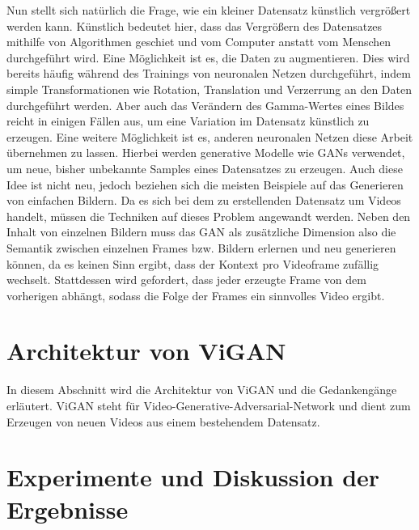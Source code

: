 Nun stellt sich natürlich die Frage, wie ein kleiner Datensatz künstlich
vergrößert werden kann. Künstlich bedeutet hier, dass das Vergrößern des
Datensatzes mithilfe von Algorithmen geschiet und vom Computer anstatt vom
Menschen durchgeführt wird. Eine Möglichkeit ist es, die Daten zu augmentieren.
Dies wird bereits häufig während des Trainings von neuronalen Netzen
durchgeführt, indem simple Transformationen wie Rotation, Translation und
Verzerrung an den Daten durchgeführt werden. Aber auch das Verändern des
Gamma-Wertes eines Bildes reicht in einigen Fällen aus, um eine Variation im
Datensatz künstlich zu erzeugen. Eine weitere Möglichkeit ist es, anderen
neuronalen Netzen diese Arbeit übernehmen zu lassen. Hierbei werden generative
Modelle wie GANs verwendet, um neue, bisher unbekannte Samples eines Datensatzes
zu erzeugen. Auch diese Idee ist nicht neu, jedoch beziehen sich die meisten
Beispiele auf das Generieren von einfachen Bildern. Da es sich bei dem zu
erstellenden Datensatz um Videos handelt, müssen die Techniken auf dieses
Problem angewandt werden. Neben den Inhalt von einzelnen Bildern muss das GAN
als zusätzliche Dimension also die Semantik zwischen einzelnen Frames bzw.
Bildern erlernen und neu generieren können, da es keinen Sinn ergibt, dass der
Kontext pro Videoframe zufällig wechselt. Stattdessen wird gefordert, dass jeder
erzeugte Frame von dem vorherigen abhängt, sodass die Folge der Frames ein
sinnvolles Video ergibt.

\section{Architektur von ViGAN}
In diesem Abschnitt wird die Architektur von ViGAN und die Gedankengänge erläutert. ViGAN steht für Video-Generative-Adversarial-Network und dient zum Erzeugen von neuen Videos aus einem bestehendem Datensatz.

\section{Experimente und Diskussion der Ergebnisse}